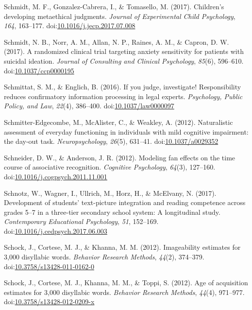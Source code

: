 \documentclass[english,man]{apa6}
\theoremstyle{definition}
\theoremstyle{definition}
\theoremstyle{definition}
\theoremstyle{remark}
\begin{document}
\hypertarget{ref-Schmidt2017}{}
Schmidt, M. F., Gonzalez-Cabrera, I., \& Tomasello, M. (2017).
Children's developing metaethical judgments. \emph{Journal of
Experimental Child Psychology}, \emph{164}, 163--177.
doi:\href{https://doi.org/10.1016/j.jecp.2017.07.008}{10.1016/j.jecp.2017.07.008}

\hypertarget{ref-Schmidt2017a}{}
Schmidt, N. B., Norr, A. M., Allan, N. P., Raines, A. M., \& Capron, D.
W. (2017). A randomized clinical trial targeting anxiety sensitivity for
patients with suicidal ideation. \emph{Journal of Consulting and
Clinical Psychology}, \emph{85}(6), 596--610.
doi:\href{https://doi.org/10.1037/ccp0000195}{10.1037/ccp0000195}

\hypertarget{ref-Schmittat2016}{}
Schmittat, S. M., \& Englich, B. (2016). If you judge, investigate!
Responsibility reduces confirmatory information processing in legal
experts. \emph{Psychology, Public Policy, and Law}, \emph{22}(4),
386--400.
doi:\href{https://doi.org/10.1037/law0000097}{10.1037/law0000097}

\hypertarget{ref-Schmitter-Edgecombe2012}{}
Schmitter-Edgecombe, M., McAlister, C., \& Weakley, A. (2012).
Naturalistic assessment of everyday functioning in individuals with mild
cognitive impairment: the day-out task. \emph{Neuropsychology},
\emph{26}(5), 631--41.
doi:\href{https://doi.org/10.1037/a0029352}{10.1037/a0029352}

\hypertarget{ref-Schneider2012}{}
Schneider, D. W., \& Anderson, J. R. (2012). Modeling fan effects on the
time course of associative recognition. \emph{Cognitive Psychology},
\emph{64}(3), 127--160.
doi:\href{https://doi.org/10.1016/j.cogpsych.2011.11.001}{10.1016/j.cogpsych.2011.11.001}

\hypertarget{ref-Schnotz2017}{}
Schnotz, W., Wagner, I., Ullrich, M., Horz, H., \& McElvany, N. (2017).
Development of students' text-picture integration and reading competence
across grades 5--7 in a three-tier secondary school system: A
longitudinal study. \emph{Contemporary Educational Psychology},
\emph{51}, 152--169.
doi:\href{https://doi.org/10.1016/j.cedpsych.2017.06.003}{10.1016/j.cedpsych.2017.06.003}

\hypertarget{ref-Schock2012}{}
Schock, J., Cortese, M. J., \& Khanna, M. M. (2012). Imageability
estimates for 3,000 disyllabic words. \emph{Behavior Research Methods},
\emph{44}(2), 374--379.
doi:\href{https://doi.org/10.3758/s13428-011-0162-0}{10.3758/s13428-011-0162-0}

\hypertarget{ref-Schock2012a}{}
Schock, J., Cortese, M. J., Khanna, M. M., \& Toppi, S. (2012). Age of
acquisition estimates for 3,000 disyllabic words. \emph{Behavior
Research Methods}, \emph{44}(4), 971--977.
doi:\href{https://doi.org/10.3758/s13428-012-0209-x}{10.3758/s13428-012-0209-x}
\end{document}
